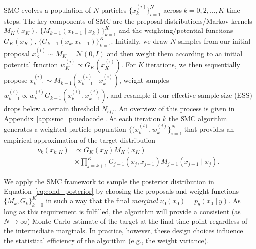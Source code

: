 SMC evolves a population of $N$ particles $\{x_k^{(i)}\}_{i=1}^N$ across $k=0,2,\ldots, K$ time steps. The key components of SMC are the proposal distributions/Markov kernels $M_K(x_K)$, $\{M_{k-1}(x_{k-1} \mid x_{k})\}_{k=1}^{K}$ and the weighting/potential functions $G_K(x_K)$, $\{G_{k-1}(x_k, x_{k-1})\}_{k=1}^{K}$. Initially, we draw $N$ samples from our initial proposal $x^{(i)}_K \sim M_K = \mathcal{N}(0, I)$ and then weight them according to an initial potential function $w^{(i)}_K \propto G_K(x^{(i)}_K)$. For $K$ iterations, we then sequentially propose $x^{(i)}_{k-1} \sim M_{k-1}(x^{(i)}_{k-1} \mid x^{(i)}_{k})$, weight samples $w^{(i)}_{k-1} \propto w^{(i)}_{k} G_{k-1}(x^{(i)}_k, x^{(i)}_{k-1})$, and resample \citep{douc2005comparison} if our effective sample size (ESS) drops below a certain threshold $N_{eff}$. An overview of this process is given in Appendix~\ref{app:smc_psuedocode}.
At each iteration $k$ the SMC algorithm generates a weighted particle population $\{(x_k^{(i)}, w_k^{(i)} \}_{i=1}^N$ that provides an empirical approximation of the target distribution
\begin{align}
    \nu_k(x_{k:K}) &\propto G_K(x_K) M_K(x_K) \nonumber \\
    &\times\prod_{j={k+1}}^K G_{j-1}(x_j, x_{j-1}) M_{j-1}(x_{j-1} \mid x_{j}).
    \label{eq:FK_formula}
\end{align}

We apply the SMC framework to sample the posterior distribution in Equation~\eqref{eq:cond_posterior} by choosing the proposals and weight functions $\{M_k, G_k \}_{k=0}^K$ in such a way that the final \textit{marginal} $\nu_0(x_0) = p_\theta(x_0 \mid y)$. As long as this requirement is fulfilled, the algorithm will provide a consistent (as $N\rightarrow \infty$) Monte Carlo estimate of the target at the final time point regardless of the intermediate marginals. In practice, however, these design choices influence the statistical efficiency of the algorithm (e.g., the weight variance).
